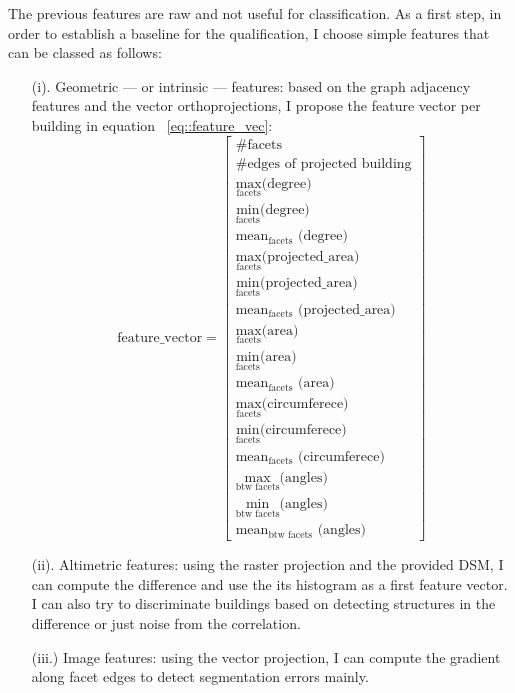 \documentclass[a4paper, 11pt]{article}
\begin{document}
	The previous features are raw and not useful for classification. As a first
	step, in order to establish a baseline for the qualification, I choose simple
	features that can be classed as follows:
	\begin{itemize}
		\item[(i).] Geometric --- or intrinsic --- features: based on the graph
		adjacency features and the vector orthoprojections, I propose the feature
		vector per building in equation ~\ref{eq::feature_vec}:
		\begin{equation}\label{eq::feature_vec}
			\text{feature\_vector} = \begin{bmatrix}
				\#\text{facets}\\
				\#\text{edges of projected building}\\
				\max_{\text{facets}} \text{(degree)}\\
				\min_{\text{facets}} \text{(degree)}\\
				\text{mean$_{\text{facets}}$ (degree)}\\
				\max_{\text{facets}} \text{(projected\_area)}\\
				\min_{\text{facets}} \text{(projected\_area)}\\
				\text{mean$_{\text{facets}}$ (projected\_area)}\\
				\max_{\text{facets}} \text{(area)}\\
				\min_{\text{facets}} \text{(area)}\\
				\text{mean$_{\text{facets}}$ (area)}\\
				\max_{\text{facets}} \text{(circumferece)}\\
				\min_{\text{facets}} \text{(circumferece)}\\
				\text{mean$_{\text{facets}}$ (circumferece)}\\
				\max_{\text{btw facets}} \text{(angles)}\\
				\min_{\text{btw facets}} \text{(angles)}\\
				\text{mean$_{\text{btw facets}}$ (angles)}
		\end{bmatrix}
		\end{equation}
		\item[(ii).] Altimetric features: using the raster projection and the
		provided DSM, I can compute the difference and use the its histogram as a
		first feature vector. I can also try to discriminate buildings based on
		detecting structures in the difference or just noise from the correlation.
		\item[(iii.)] Image features: using the vector projection, I can compute
		the gradient along facet edges to detect segmentation errors mainly.
	\end{itemize}
\end{document}
